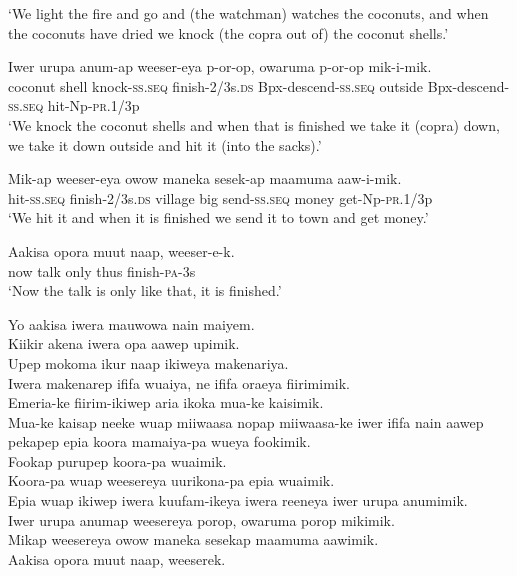 \glt ‘We light the fire and go and (the watchman) watches the coconuts, and when the coconuts have dried we knock (the copra out of) the coconut shells.’ \\
\z


\ea\label{ex:a:x10}
\gll  Iwer  urupa  anum-ap  weeser-eya  p-or-op,                  owaruma  p-or-op  mik-i-mik. \\
coconut  shell  knock-\textsc{ss.seq}  finish-2/3s.\textsc{ds}  Bpx-descend-\textsc{ss.seq}  outside  Bpx-descend-\textsc{ss.seq}  hit-Np-\textsc{pr}.1/3p \\


\glt ‘We knock the coconut shells and when that is finished we take it (copra) down, we take it down outside and hit it (into the sacks).’ \\
\z


\ea\label{ex:a:x11}
\gll  Mik-ap  weeser-eya  owow  maneka  sesek-ap  maamuma  aaw-i-mik. \\
hit-\textsc{ss.seq}  finish-2/3s.\textsc{ds}  village  big  send-\textsc{ss.seq}  money  get-Np-\textsc{pr}.1/3p \\
\glt ‘We hit it and when it is finished we send it to town and get money.’ \\
\z


\ea\label{ex:a:x12}
\gll  Aakisa  opora  muut  naap,  weeser-e-k. \\
now  talk  only  thus  finish-\textsc{pa}-3s \\
\glt ‘Now the talk is only like that, it is finished.’ \\
\z


Yo aakisa iwera mauwowa nain maiyem. \\
Kiikir akena iwera opa aawep upimik. \\
Upep mokoma ikur naap ikiweya makenariya. \\
Iwera makenarep ififa wuaiya, ne ififa oraeya fiirimimik. \\
Emeria-ke fiirim-ikiwep aria ikoka mua-ke kaisimik. \\
Mua-ke kaisap neeke wuap miiwaasa nopap miiwaasa-ke iwer ififa nain aawep pekapep epia koora mamaiya-pa wueya fookimik. \\
Fookap purupep koora-pa wuaimik. \\
Koora-pa wuap weesereya uurikona-pa epia wuaimik. \\
Epia wuap ikiwep iwera kuufam-ikeya iwera reeneya iwer urupa anumimik. \\
Iwer urupa anumap weesereya porop, owaruma porop mikimik. \\
Mikap weesereya owow maneka sesekap maamuma aawimik. \\
\textrm{Aakisa opora muut naap, weeserek.  }
\setcounter{equation}{0}
